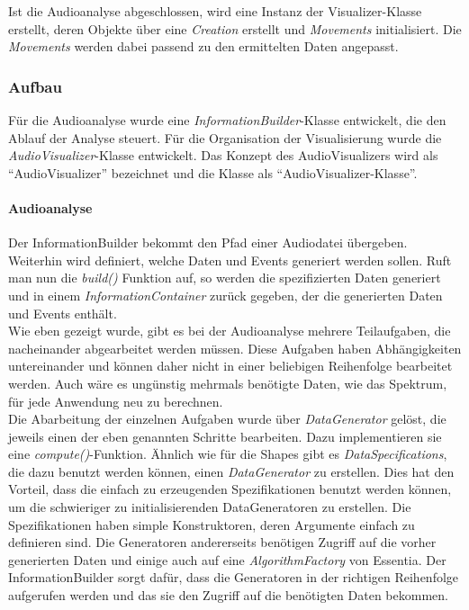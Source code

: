 \documentclass[11pt,a4paper]{article}
\begin{document}
Ist die Audioanalyse abgeschlossen, wird eine Instanz der Visualizer-Klasse erstellt, deren Objekte über eine \textit{Creation} erstellt und \textit{Movements} initialisiert. Die \textit{Movements} werden dabei passend zu den ermittelten Daten angepasst.

\subsubsection{Aufbau}
Für die Audioanalyse wurde eine \textit{InformationBuilder}-Klasse entwickelt, die den Ablauf der Analyse steuert. Für die Organisation der Visualisierung wurde die \textit{AudioVisualizer}-Klasse entwickelt. Das Konzept des AudioVisualizers wird als ``AudioVisualizer'' bezeichnet und die Klasse als ``AudioVisualizer-Klasse''.

\paragraph{Audioanalyse}
Der InformationBuilder bekommt den Pfad einer Audiodatei übergeben. Weiterhin wird definiert, welche Daten und Events generiert werden sollen. Ruft man nun die \textit{build()} Funktion auf, so werden die spezifizierten Daten generiert und in einem \textit{InformationContainer} zurück gegeben, der die generierten Daten und Events enthält.\\
Wie eben gezeigt wurde, gibt es bei der Audioanalyse mehrere Teilaufgaben, die nacheinander abgearbeitet werden müssen. Diese Aufgaben haben Abhängigkeiten untereinander und können daher nicht in einer beliebigen Reihenfolge bearbeitet werden. Auch wäre es ungünstig mehrmals benötigte Daten, wie das Spektrum, für jede Anwendung neu zu berechnen.\\
Die Abarbeitung der einzelnen Aufgaben wurde über \textit{DataGenerator} gelöst, die jeweils einen der eben genannten Schritte bearbeiten. Dazu implementieren sie eine \textit{compute()}-Funktion. Ähnlich wie für die Shapes gibt es \textit{DataSpecifications}, die dazu benutzt werden können, einen \textit{DataGenerator} zu erstellen. Dies hat den Vorteil, dass die einfach zu erzeugenden Spezifikationen benutzt werden können, um die schwieriger zu initialisierenden DataGeneratoren zu erstellen. Die Spezifikationen haben simple Konstruktoren, deren Argumente einfach zu definieren sind. Die Generatoren andererseits benötigen Zugriff auf die vorher generierten Daten und einige auch auf eine \textit{AlgorithmFactory} von Essentia. Der InformationBuilder sorgt dafür, dass die Generatoren in der richtigen Reihenfolge aufgerufen werden und das sie den Zugriff auf die benötigten Daten bekommen.\\
\end{document}
